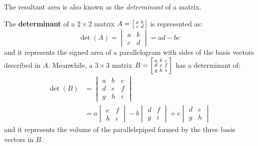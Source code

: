 The resultant area is also known as the \emph{determinant} of a matrix.
\begin{definition}
  The \textbf{determinant} of a \(2\times2\) matrix \(A=\begin{bsmallmatrix}
    a & b \\
    c & d
  \end{bsmallmatrix} \) is represented as:
  \begin{equation*}
    \det(A) = \begin{vmatrix}
      a & b \\
      c & d
    \end{vmatrix} = ad - bc
  \end{equation*}
  and it represents the signed area of a parallelogram with sides of the basis vectors described in \(A\). Meanwhile, a \(3\times3\) matrix \(B=\begin{bsmallmatrix}
    a & b & c \\
    d & e & f \\
    g & h & i
  \end{bsmallmatrix} \) has a determinant of:
  \begin{align*}
    \det(B) &= \begin{vmatrix}
      a & b & c \\
      d & e & f \\
      g & h & i
    \end{vmatrix} \\
    &= a\begin{vmatrix}
      e & f \\
      h & i
    \end{vmatrix}  - b\begin{vmatrix}
      d & f \\
      g & i
    \end{vmatrix}  + c\begin{vmatrix}
      d & e \\
      g & h
    \end{vmatrix} 
  \end{align*}
  and it represents the volume of the parallelepiped formed by the three basis vectors in \(B\).
\end{definition}
